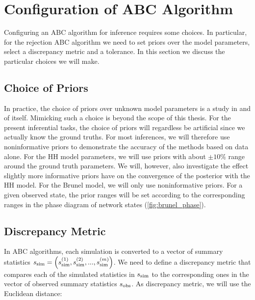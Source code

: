 \section{Configuration of ABC Algorithm}

Configuring an ABC algorithm for inference requires some choices. In particular, for the rejection ABC algorithm we need to set priors over the model parameters, select a discrepancy metric and a tolerance. In this section we discuss the particular choices we will make. 

\subsection{Choice of Priors}

In practice, the choice of priors over unknown model parameters is a study in and of itself. Mimicking such a choice is beyond the scope of this thesis. For the present inferential tasks, the choice of priors will regardless be artificial since we actually know the ground truths. For most inferences, we will therefore use noninformative priors to demonstrate the accuracy of the methods based on data alone. For the HH model parameters, we will use priors with about $\pm 10\%$ range around the ground truth parameters. We will, however, also investigate the effect slightly more informative priors have on the convergence of the posterior with the HH model. For the Brunel model, we will only use noninformative priors. For a given observed state, the prior ranges will be set according to the corresponding ranges in the phase diagram of network states (\autoref{fig:brunel_phase}). 

\subsection{Discrepancy Metric}

In ABC algorithms, each simulation is converted to a vector of summary statistics $s_\mathrm{sim} = \qty(s_{\mathrm{sim}}^{(1)}, s_{\mathrm{sim}}^{(2)}, ... , s_{\mathrm{sim}}^{(m)})$. We need to define a discrepancy metric that compares each of the simulated statistics in $s_\mathrm{sim}$ to the corresponding ones in the vector of observed summary statistics $s_\mathrm{obs}$. As discrepancy metric, we will use the Euclidean distance: 

